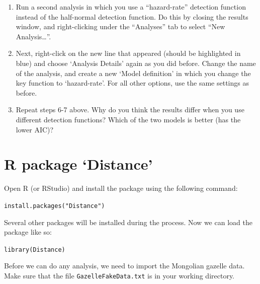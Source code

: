 \documentclass[12pt]{article}\usepackage[]{graphicx}\usepackage[]{color}
\makeatletter
\newcommand{\hlstr}[1]{\textcolor[rgb]{0.749,0.012,0.012}{#1}}%
\newcommand{\hlstd}[1]{\textcolor[rgb]{0,0,0}{#1}}%
\newcommand{\hlkwd}[1]{\textcolor[rgb]{0.004,0.004,0.506}{#1}}%
\newenvironment{kframe}{%
 \def\at@end@of@kframe{}%
 \ifinner\ifhmode%
  \def\at@end@of@kframe{\end{minipage}}%
  \begin{minipage}{\columnwidth}%
 \fi\fi%
 \def\FrameCommand##1{\hskip\@totalleftmargin \hskip-\fboxsep
 \colorbox{shadecolor}{##1}\hskip-\fboxsep
     \hskip-\linewidth \hskip-\@totalleftmargin \hskip\columnwidth}%
 \MakeFramed {\advance\hsize-\width
   \@totalleftmargin\z@ \linewidth\hsize
   \@setminipage}}%
 {\par\unskip\endMakeFramed%
 \at@end@of@kframe}
\newenvironment{knitrout}{}{} %
\makeatother
\begin{document}
\begin{enumerate}
  \item Run a second analysis in which you use a ``hazard-rate''
    detection function instead of the half-normal detection
    function. Do this by closing the results window, and
    right-clicking under the ``Analyses'' tab to select ``New Analysis\dots''.  
  \item Next, right-click on the new line that appeared (should be
    highlighted in blue) and choose `Analysis Details' again as you
    did before. Change the name of the analysis, and create a new
    `Model definition' in which you change the key function to
    `hazard-rate'. For all other options, use the same settings as
    before.   
  \item Repeat steps 6-7 above. Why do you think the results differ
    when you use different detection functions? Which of the two
    models is better (has the lower AIC)?  
\end{enumerate}


\clearpage


\section*{R package `Distance'}

Open R (or RStudio) and install the package using the following
command: 

\begin{knitrout}
\color{fgcolor}\begin{kframe}
\begin{alltt}
\hlkwd{install.packages}\hlstd{(}\hlstr{"Distance"}\hlstd{)}
\end{alltt}
\end{kframe}
\end{knitrout}

Several other packages will be installed during the process. Now we
can load the package like so: 

\begin{knitrout}
\color{fgcolor}\begin{kframe}
\begin{alltt}
\hlkwd{library}\hlstd{(Distance)}
\end{alltt}
\end{kframe}
\end{knitrout}

Before we can do any analysis, we need to import the Mongolian gazelle
data. Make sure that the file \texttt{GazelleFakeData.txt} is in your
working directory.
\end{document}
